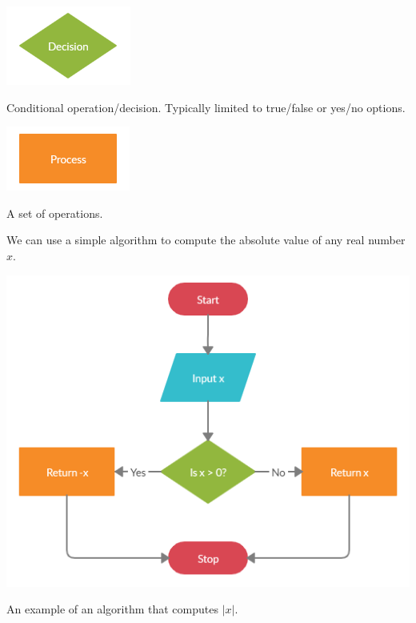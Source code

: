 \documentclass{ximera}
\begin{document}
\begin{center}
	\includegraphics{decision.png}
\end{center}
\begin{center}
	Conditional operation/decision. Typically limited to true/false or yes/no options.
\end{center}

\begin{center}
	\includegraphics{process.png}
\end{center}
\begin{center}
	A set of operations.
\end{center}

We can use a simple algorithm to compute the absolute value of any real number $x$.

\begin{center}
	\includegraphics{absalgo.png}
\end{center}
\begin{center}
	An example of an algorithm that computes $|x|$.
\end{center}
\end{document}
